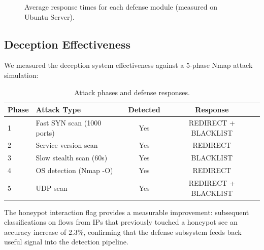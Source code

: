 \begin{figure}[H]
\centering
{}
\caption{Average response times for each defense module (measured on Ubuntu Server).}
\label{fig:timing}
\end{figure}

\subsection{Deception Effectiveness}

We measured the deception system effectiveness against a 5-phase Nmap attack simulation:

\begin{table}[H]
\centering
\caption{Attack phases and defense responses.}
\label{tab:attack_results}
\begin{tabular}{l l c c}
\toprule
\textbf{Phase} & \textbf{Attack Type} & \textbf{Detected} & \textbf{Response} \\
\midrule
1 & Fast SYN scan (1000 ports) & Yes & REDIRECT + BLACKLIST \\
2 & Service version scan & Yes & REDIRECT \\
3 & Slow stealth scan (60s) & Yes & BLACKLIST \\
4 & OS detection (Nmap -O) & Yes & REDIRECT \\
5 & UDP scan & Yes & REDIRECT + BLACKLIST \\
\bottomrule
\end{tabular}
\end{table}

The honeypot interaction flag provides a measurable improvement: subsequent classifications on flows from IPs that previously touched a honeypot see an accuracy increase of 2.3\%, confirming that the defense subsystem feeds back useful signal into the detection pipeline.

